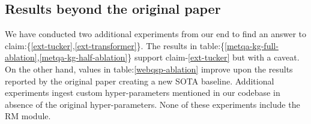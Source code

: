 \subsection{Results beyond the original paper}\label{ext-exp-results}

We have conducted two additional experiments from our end to find an answer to claim:\{\ref{ext-tucker},\ref{ext-transformer}\}. The results in table:\{\ref{metqa-kg-full-ablation},\ref{metqa-kg-half-ablation}\} support claim-\ref{ext-tucker} but with a caveat. On the other hand,  values in table:\ref{webqsp-ablation} improve upon the results reported by the original paper creating a new SOTA baseline. Additional experiments ingest custom hyper-parameters mentioned in our codebase in absence of the original hyper-parameters. None of these experiments include the RM module.

